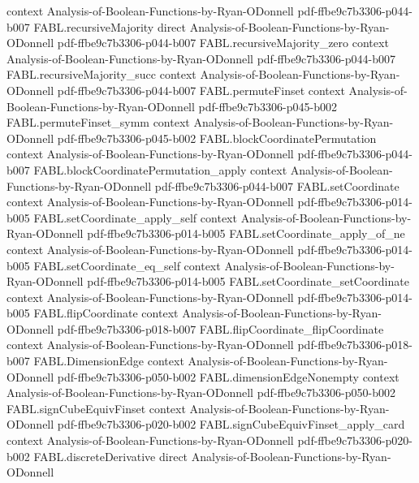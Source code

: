 \begin{theorem}
  {context}
  {Analysis-of-Boolean-Functions-by-Ryan-ODonnell}
  {pdf-ffbe9c7b3306-p044-b007}
\proofstep
  {FABL.recursiveMajority}
  {direct}
  {Analysis-of-Boolean-Functions-by-Ryan-ODonnell}
  {pdf-ffbe9c7b3306-p044-b007}
\proofstep
  {FABL.recursiveMajority_zero}
  {context}
  {Analysis-of-Boolean-Functions-by-Ryan-ODonnell}
  {pdf-ffbe9c7b3306-p044-b007}
\proofstep
  {FABL.recursiveMajority_succ}
  {context}
  {Analysis-of-Boolean-Functions-by-Ryan-ODonnell}
  {pdf-ffbe9c7b3306-p044-b007}
\proofstep
  {FABL.permuteFinset}
  {context}
  {Analysis-of-Boolean-Functions-by-Ryan-ODonnell}
  {pdf-ffbe9c7b3306-p045-b002}
\proofstep
  {FABL.permuteFinset_symm}
  {context}
  {Analysis-of-Boolean-Functions-by-Ryan-ODonnell}
  {pdf-ffbe9c7b3306-p045-b002}
\proofstep
  {FABL.blockCoordinatePermutation}
  {context}
  {Analysis-of-Boolean-Functions-by-Ryan-ODonnell}
  {pdf-ffbe9c7b3306-p044-b007}
\proofstep
  {FABL.blockCoordinatePermutation_apply}
  {context}
  {Analysis-of-Boolean-Functions-by-Ryan-ODonnell}
  {pdf-ffbe9c7b3306-p044-b007}
\proofstep
  {FABL.setCoordinate}
  {context}
  {Analysis-of-Boolean-Functions-by-Ryan-ODonnell}
  {pdf-ffbe9c7b3306-p014-b005}
\proofstep
  {FABL.setCoordinate_apply_self}
  {context}
  {Analysis-of-Boolean-Functions-by-Ryan-ODonnell}
  {pdf-ffbe9c7b3306-p014-b005}
\proofstep
  {FABL.setCoordinate_apply_of_ne}
  {context}
  {Analysis-of-Boolean-Functions-by-Ryan-ODonnell}
  {pdf-ffbe9c7b3306-p014-b005}
\proofstep
  {FABL.setCoordinate_eq_self}
  {context}
  {Analysis-of-Boolean-Functions-by-Ryan-ODonnell}
  {pdf-ffbe9c7b3306-p014-b005}
\proofstep
  {FABL.setCoordinate_setCoordinate}
  {context}
  {Analysis-of-Boolean-Functions-by-Ryan-ODonnell}
  {pdf-ffbe9c7b3306-p014-b005}
\proofstep
  {FABL.flipCoordinate}
  {context}
  {Analysis-of-Boolean-Functions-by-Ryan-ODonnell}
  {pdf-ffbe9c7b3306-p018-b007}
\proofstep
  {FABL.flipCoordinate_flipCoordinate}
  {context}
  {Analysis-of-Boolean-Functions-by-Ryan-ODonnell}
  {pdf-ffbe9c7b3306-p018-b007}
\proofstep
  {FABL.DimensionEdge}
  {context}
  {Analysis-of-Boolean-Functions-by-Ryan-ODonnell}
  {pdf-ffbe9c7b3306-p050-b002}
\proofstep
  {FABL.dimensionEdgeNonempty}
  {context}
  {Analysis-of-Boolean-Functions-by-Ryan-ODonnell}
  {pdf-ffbe9c7b3306-p050-b002}
\proofstep
  {FABL.signCubeEquivFinset}
  {context}
  {Analysis-of-Boolean-Functions-by-Ryan-ODonnell}
  {pdf-ffbe9c7b3306-p020-b002}
\proofstep
  {FABL.signCubeEquivFinset_apply_card}
  {context}
  {Analysis-of-Boolean-Functions-by-Ryan-ODonnell}
  {pdf-ffbe9c7b3306-p020-b002}
\proofstep
  {FABL.discreteDerivative}
  {direct}
  {Analysis-of-Boolean-Functions-by-Ryan-ODonnell}

\end{theorem}
